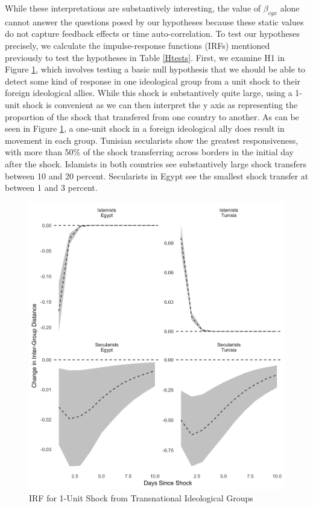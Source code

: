 \documentclass[12pt]{article}
\begin{document}
While these interpretations are substantively interesting, the value of $\beta_{cgx}$ alone cannot answer the questions posed by our hypotheses because these static values do not capture feedback effects or time auto-correlation. To test our hypotheses precisely, we calculate the impulse-response functions (IRFs) mentioned previously to test the hypotheses in Table \ref{Htests}. First, we examine H1 in Figure \ref{cross_irf}, which involves testing a basic null hypothesis that we should be able to detect some kind of response in one ideological group from a unit shock to their foreign ideological allies. While this shock is substantively quite large, using a 1-unit shock is convenient as we can then interpret the y axis as representing the proportion of the shock that transfered from one country to another. As can be seen in Figure \ref{cross_irf}, a one-unit shock in a foreign ideological ally does result in movement in each group. Tunisian secularists show the greatest responsiveness, with more than 50\% of the shock transferring across borders in the initial day after the shock. Islamists in both countries see substantively large shock transfers between 10 and 20 percent. Secularists in Egypt see the smallest shock transfer at between 1 and 3 percent.
 \begin{figure}[!h]
	\centering
	\caption{IRF for 1-Unit Shock from Transnational Ideological Groups}\label{cross_irf}
	\centering
	\includegraphics[width=.9\linewidth]{irf_egypt_panels}
\end{figure}
\end{document}
